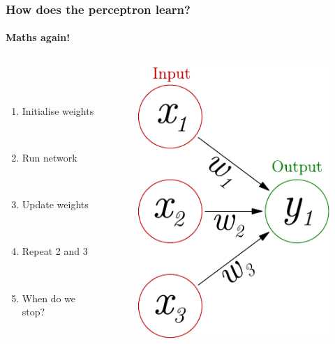\documentclass{beamer}
\newcommand{\figheight}{0.72\textheight}
\begin{document}
\begin{frame}
\frametitle{How does the perceptron learn?}
\framesubtitle{Maths again!}
  \begin{columns}[T]
    \begin{column}{.45\textwidth} 
        \  \\
 \   \\ 
\begin{enumerate}
 \item<1-> Initialise weights
 
 \ \\
 \item<1-> Run network
 
 \ \\
 
 \item<1-> Update weights
 
  \ \\
 
 \item<1-> Repeat 2 and 3
 
 \ \\

 \item<2> When do we stop?
\end{enumerate}


    \end{column}
    \begin{column}{.55\textwidth}
\begin{figure}[t]
 \centering
 \includegraphics[height = \figheight]{./fig/perceptron_maths.pdf}
\end{figure}
    \end{column}
  \end{columns}
\end{frame}
\end{document}
